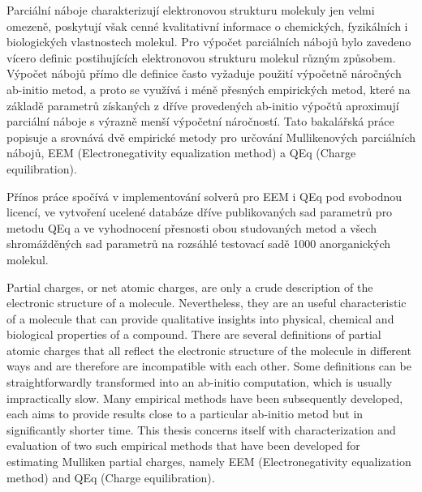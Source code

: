 \documentclass[11pt,draft,oneside]{fithesis2}
\begin{document}
\begin{ThesisAbstract}




Parciální náboje charakterizují elektronovou strukturu molekuly jen velmi omezeně, poskytují však cenné kvalitativní informace o chemických, fyzikálních i biologických vlastnostech molekul. Pro výpočet parciálních nábojů bylo zavedeno vícero definic postihujících elektronovou strukturu molekul různým způsobem. Výpočet nábojů přímo dle definice často vyžaduje použití výpočetně náročných ab-initio metod, a proto se využívá i méně přesných empirických metod, které na základě parametrů získaných z dříve provedených ab-initio výpočtů aproximují parciální náboje s výrazně menší výpočetní náročností. Tato bakalářská práce popisuje a srovnává dvě empirické metody pro určování Mullikenových parciálních nábojů, EEM (Electronegativity equalization method) a QEq (Charge equilibration).

Přínos práce spočívá v implementování solverů pro EEM i QEq pod svobodnou licencí, ve vytvoření ucelené databáze dříve publikovaných sad parametrů pro metodu QEq a ve vyhodnocení přesnosti obou studovaných metod a všech shromážděných sad parametrů na rozsáhlé testovací sadě 1000 anorganických molekul.

Partial charges, or net atomic charges, are only a crude description of the electronic structure of a molecule. Nevertheless, they are an useful characteristic of a molecule that can provide qualitative insights into physical, chemical and biological properties of a compound. There are several definitions of partial atomic charges that all reflect the electronic structure of the molecule in different ways and are therefore are incompatible with each other. Some definitions can be straightforwardly transformed into an ab-initio computation, which is usually impractically slow. Many empirical methods have been subsequently developed, each aims to provide results close to a particular ab-initio metod but in significantly shorter time. This thesis concerns itself with characterization and evaluation of two such empirical methods that have been developed for estimating Mulliken partial charges, namely EEM (Electronegativity equalization method) and QEq (Charge equilibration).


\end{ThesisAbstract}
\end{document}
